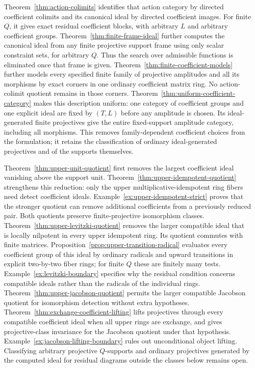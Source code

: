 \documentclass[11pt]{amsart}
\theoremstyle{definition}
\theoremstyle{remark}
\begin{document}
Theorem~\ref{thm:action-colimits} identifies that action category by directed coefficient colimits and its canonical ideal by directed coefficient images. For finite $Q$, it gives exact residual coefficient blocks, with arbitrary $L$ and arbitrary coefficient groups. Theorem~\ref{thm:finite-frame-ideal} further computes the canonical ideal from any finite projective support frame using only scalar constraint sets, for arbitrary $Q$. Thus the search over admissible functions is eliminated once that frame is given. Theorem~\ref{thm:finite-coefficient-models} further models every specified finite family of projective amplitudes and all its morphisms by exact corners in one ordinary coefficient matrix ring. No action-colimit quotient remains in those corners. Theorem~\ref{thm:uniform-coefficient-category} makes this description uniform: one category of coefficient groups and one explicit ideal are fixed by $(T,L)$ before any amplitude is chosen. Its ideal-generated finite projectives give the entire fixed-support amplitude category, including all morphisms. This removes family-dependent coefficient choices from the formulation; it retains the classification of ordinary ideal-generated projectives and of the supports themselves.

Theorem~\ref{thm:upper-unit-quotient} first removes the largest coefficient ideal vanishing above the support unit. Theorem~\ref{thm:upper-idempotent-quotient} strengthens this reduction: only the upper multiplicative-idempotent ring fibers need detect coefficient ideals. Example~\ref{ex:upper-idempotent-strict} proves that the stronger quotient can remove additional coefficients from a previously reduced pair. Both quotients preserve finite-projective isomorphism classes. Theorem~\ref{thm:upper-levitzki-quotient} removes the larger compatible ideal that is locally nilpotent in every upper idempotent ring. Its quotient commutes with finite matrices. Proposition~\ref{prop:upper-transition-radical} evaluates every coefficient group of this ideal by ordinary radicals and upward transitions in explicit two-by-two fiber rings; for finite $Q$ these are finitely many tests. Example~\ref{ex:levitzki-boundary} specifies why the residual condition concerns compatible ideals rather than the radicals of the individual rings. Theorem~\ref{thm:upper-jacobson-quotient} permits the larger compatible Jacobson quotient for isomorphism detection without extra hypotheses. Theorem~\ref{thm:exchange-coefficient-lifting} lifts projectives through every compatible coefficient ideal when all upper rings are exchange, and gives projective-class invariance for the Jacobson quotient under that hypothesis. Example~\ref{ex:jacobson-lifting-boundary} rules out unconditional object lifting. Classifying arbitrary projective $Q$-supports and ordinary projectives generated by the computed ideal for residual diagrams outside the classes below remains open.
\end{document}
